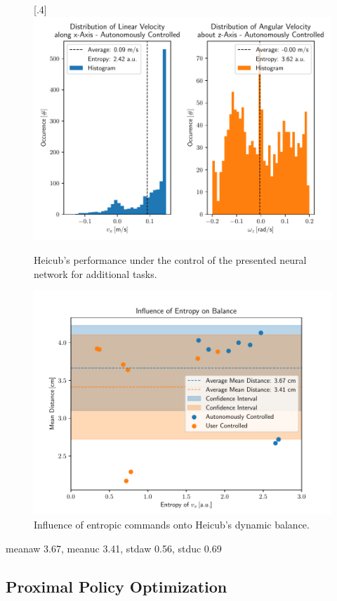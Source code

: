 \begin{figure}[h]
	[.4\linewidth]{\includegraphics[scale=.35]{chapters/05_experiments/02_autonomous_walking/semantic_walk_01_entropy.pdf}}
	\caption{Heicub's performance under the control of the presented neural network for additional tasks.}
	\label{fig::524_aw_additional}
\end{figure}
\begin{figure}[h]
	\centering
	\includegraphics[scale=.5]{chapters/05_experiments/02_autonomous_walking/entropy_against_balance.pdf}
	\caption{Influence of entropic commands onto Heicub's dynamic balance.}
	\label{fig::524_entropy_balance}
\end{figure}
meanaw 3.67, meanuc 3.41, stdaw 0.56, stduc 0.69
\subsection{Proximal Policy Optimization}
